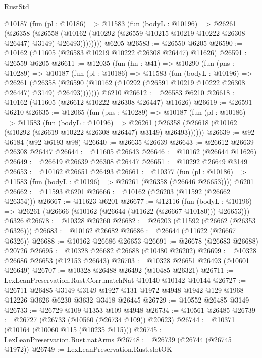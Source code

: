 \begin{lexlean}{RustStd}
\begin{coremodule}
        @10187
          (fun (pl : @10186) =>
          @11583
            (fun (bodyL : @10196) =>
            @26261
              (@26358
                (@26558
                  (@10162 (@10292 (@26559 @10215 @10219 @10222 @26308 @26447) @3149) @26493))))))))
    @6205
@26583 := @26550 @6205
@26590 := @10162 (@11605 (@26583 @10219 @10222 @26308 @26447) @11626)
@26591 := @26559 @6205
@26611 := @12035
    (fun (hn : @41) =>
    @10290
      (fun (pns : @10289) =>
      @10187
        (fun (pl : @10186) =>
        @11583
          (fun (bodyL : @10196) =>
          @26261
            (@26358
              (@26590 (@10162 (@10292 (@26591 @10219 @10222 @26308 @26447) @3149) @26493)))))))
    @6210
@26612 := @26583 @6210
@26618 := @10162 (@11605 (@26612 @10222 @26308 @26447) @11626)
@26619 := @26591 @6210
@26635 := @12065
    (fun (pns : @10289) =>
    @10187
      (fun (pl : @10186) =>
      @11583
        (fun (bodyL : @10196) =>
        @26261 (@26358 (@26618 (@10162 (@10292 (@26619 @10222 @26308 @26447) @3149) @26493))))))
@26639 := @92 @6184 (@92 @6193 @98)
@26640 := @26635 @26639
@26643 := @26612 @26639 @26308 @26447
@26644 := @11605 @26643
@26646 := @10162 (@26644 @11626)
@26649 := @26619 @26639 @26308 @26447
@26651 := @10292 @26649 @3149
@26653 := @10162 @26651 @26493
@26661 := @10377
    (fun (pl : @10186) => @11583 (fun (bodyL : @10196) => @26261 (@26358 (@26646 @26653))))
    @6201
@26662 := @11593 @6201
@26666 := @10162 (@26203 (@11592 (@26662 @26354)))
@26667 := @11623 @6201
@26677 := @12116
    (fun (bodyL : @10196) => @26261 (@26666 (@10162 (@26644 (@11622 (@26667 @10180))) @26653)))
    @6326
@26678 := @10328 @26260
@26682 := @26203 (@11592 (@26662 (@26353 @6326)))
@26683 := @10162 @26682
@26686 := @26644 (@11622 (@26667 @6326))
@26688 := @10162 @26686 @26653
@26691 := @26678 (@26683 @26688) @20726
@26695 := @10328 @26682 @26688 (@10480 @26202)
@26699 := @10328 @26686 @26653 (@12153 @26643)
@26703 := @10328 @26651 @26493 (@10601 @26649)
@26707 := @10328 @26488 @26492 (@10485 @26321)
@26711 := LexLeanPreservation.Rust.Corr.matchNat @10140 @10142 @10144
@26727 := @26711
    @26485
    @3149
    @3149
    @1927
    @131
    @1972
    @4948
    @1942
    @129
    @1968
    @12226
    @3626
    @6230
    @3632
    @3418
    @26445
@26729 := @10552 @26485 @3149
@26733 := @26729 @109 @1353 @109 @4948
@26734 := @10561 @26485
@26739 := @26727 (@26733 (@10560 (@26734 @109)) @20623)
@26744 := @10371 (@10164 (@10060 @115 (@10235 @115)))
@26745 := LexLeanPreservation.Rust.natArms
@26748 := @26739 (@26744 (@26745 @1972))
@26749 := LexLeanPreservation.Rust.slotOK

\end{coremodule}
\end{lexlean}
